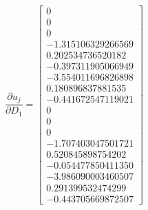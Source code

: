 \documentclass[12pt,parskip=full]{article}
\numberwithin{subsection}{section}
\begin{document}
		\begin{equation}
			\frac{\partial u_j}{\partial D_1} = \begin{bmatrix} 0 \\
                   0 \\
                   0 \\
  -1.315106329266569 \\ 
   0.202534736520182 \\
  -0.397311905066949 \\
  -3.554011696826898 \\
   0.180896837881535 \\
  -0.441672547119021 \\
                   0 \\
                   0 \\
                   0 \\
  -1.707403047501721 \\
   0.520845898754202 \\
  -0.054477850411350 \\
  -3.986090003460507 \\
   0.291399532474299 \\
  -0.443705669872507
   			\end{bmatrix}
		\end{equation}
\end{document}
